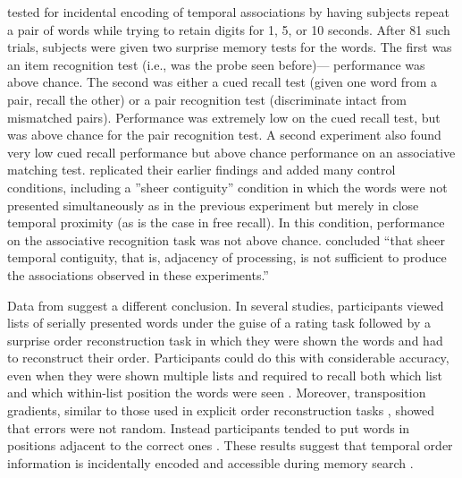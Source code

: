 \documentclass[man,natbib,floatsintext]{apa6} %
\begin{document}
\citet{GlenBrad79} tested for incidental encoding of temporal associations by having subjects repeat a pair of words while trying to retain digits for 1, 5, or 10 seconds. After 81 such trials, subjects were given two surprise memory tests for the words. The first was an item recognition test (i.e., was the probe seen before)--- performance was above chance. The second was either a cued recall test (given one word from a pair, recall the other) or a pair recognition test (discriminate intact from mismatched pairs). Performance was extremely low on the cued recall test, but was above chance for the pair recognition test. A second experiment also found very low cued recall performance but above chance performance on an associative matching test. \citet{BradGlen83} replicated their earlier findings and added many control conditions, including a ''sheer contiguity'' condition in which the words were not presented simultaneously as in the previous experiment but merely in close temporal proximity (as is the case in free recall). In this condition, performance on the associative recognition task was not above chance. \citet[][p. 665]{BradGlen83} concluded ``that sheer temporal contiguity, that is, adjacency of processing, is not sufficient to produce the associations observed in these experiments.'' 

Data from \citet{Nair91, Nair90b} suggest a different conclusion. In several studies, participants viewed lists of serially presented words under the guise of a rating task followed by a surprise order reconstruction task in which they were shown the words and had to reconstruct their order. Participants could do this with considerable accuracy, even when they were shown multiple lists and required to recall both which list and which within-list position the words were seen \citet{Nair91}. Moreover, transposition gradients, similar to those used in explicit order reconstruction tasks \cite{Heal74}, showed that errors were not random. Instead participants tended to put words in positions adjacent to the correct ones \citet{Nair91}. These results suggest that temporal order information is incidentally encoded and accessible during memory search \citep[but see][for a different prespective]{Hint16}. 
\end{document}
